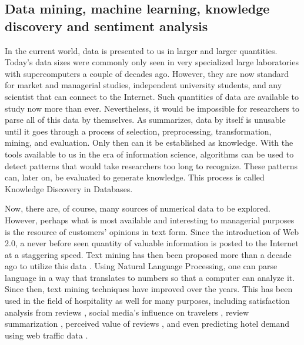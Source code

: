 \documentclass[smallextended,natbib]{svjour3}       %
\begin{document}
\subsection{Data mining, machine learning, knowledge discovery and sentiment analysis}\label{theory_data}

In the current world, data is presented to us in larger and larger quantities. Today's data sizes were commonly only seen in very specialized large laboratories with supercomputers a couple of decades ago. However, they are now standard for market and managerial studies, independent university students, and any scientist that can connect to the Internet. Such quantities of data are available to study now more than ever. Nevertheless, it would be impossible for researchers to parse all of this data by themselves. As \cite{fayyad1996data} summarizes, data by itself is unusable until it goes through a process of selection, preprocessing, transformation, mining, and evaluation. Only then can it be established as knowledge. With the tools available to us in the era of information science, algorithms can be used to detect patterns that would take researchers too long to recognize. These patterns can, later on, be evaluated to generate knowledge. This process is called Knowledge Discovery in Databases. 

Now, there are, of course, many sources of numerical data to be explored.  However, perhaps what is most available and interesting to managerial purposes is the resource of customers' opinions in text form. Since the introduction of Web 2.0, a never before seen quantity of valuable information is posted to the Internet at a staggering speed. Text mining has then been proposed more than a decade ago to utilize this data \cite[e.g.][]{rajman1998text,nahm2002text}. Using Natural Language Processing, one can parse language in a way that translates to numbers so that a computer can analyze it. Since then, text mining techniques have improved over the years. This has been used in the field of hospitality as well for many purposes, including satisfaction analysis from reviews \cite[e.g][]{berezina2016, xu2016, xiang2015, hargreaves2015, balbi2018}, social media's influence on travelers \cite[e.g.][]{xiang2010}, review summarization \cite[e.g.][]{hu2017436}, perceived value of reviews \cite[e.g][]{FANG2016498}, and even predicting hotel demand using web traffic data \cite[e.g][]{yang2014}.
\end{document}
